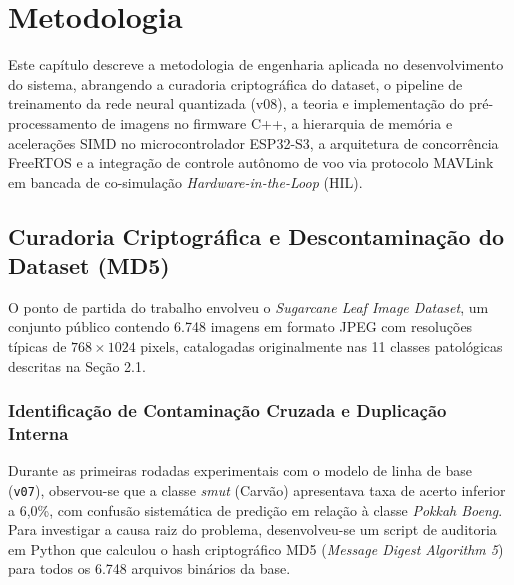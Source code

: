 \chapter{Metodologia}
\label{cap:metodologia}

Este capítulo descreve a metodologia de engenharia aplicada no desenvolvimento do sistema, abrangendo a curadoria criptográfica do dataset, o pipeline de treinamento da rede neural quantizada (v08), a teoria e implementação do pré-processamento de imagens no firmware C++, a hierarquia de memória e acelerações SIMD no microcontrolador ESP32-S3, a arquitetura de concorrência FreeRTOS e a integração de controle autônomo de voo via protocolo MAVLink em bancada de co-simulação \textit{Hardware-in-the-Loop} (HIL).

\section{Curadoria Criptográfica e Descontaminação do Dataset (MD5)}
\label{sec:auditoria_md5}

O ponto de partida do trabalho envolveu o \textit{Sugarcane Leaf Image Dataset}, um conjunto público contendo 6.748 imagens em formato JPEG com resoluções típicas de $768 \times 1024$ pixels, catalogadas originalmente nas 11 classes patológicas descritas na Seção 2.1.

\subsection{Identificação de Contaminação Cruzada e Duplicação Interna}

Durante as primeiras rodadas experimentais com o modelo de linha de base (\texttt{v07}), observou-se que a classe \textit{smut} (Carvão) apresentava taxa de acerto inferior a 6,0\%, com confusão sistemática de predição em relação à classe \textit{Pokkah Boeng}. Para investigar a causa raiz do problema, desenvolveu-se um script de auditoria em Python que calculou o hash criptográfico MD5 (\textit{Message Digest Algorithm 5}) para todos os 6.748 arquivos binários da base.

